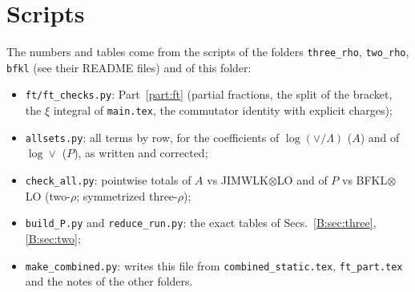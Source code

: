 \documentclass[10pt]{article}
\numberwithin{equation}{section}
\begin{document}
\section{Scripts}\label{app:scripts}
The numbers and tables come from the scripts of the folders \texttt{three\_rho}, \texttt{two\_rho}, \texttt{bfkl} (see their README files) and of this folder:
\begin{itemize}
\item \texttt{ft/ft\_checks.py}: Part~\ref{part:ft} (partial fractions, the split of the bracket, the $\xi$ integral of \texttt{main.tex}, the commutator identity with explicit charges);
\item \texttt{allsets.py}: all terms by row, for the coefficients of $\log(\vee/\Lambda)$ ($A$) and of $\log\vee$ ($P$), as written and corrected;
\item \texttt{check\_all.py}: pointwise totals of $A$ vs JIMWLK$\otimes$LO and of $P$ vs BFKL$\otimes$LO (two-$\rho$; symmetrized three-$\rho$);
\item \texttt{build\_P.py} and \texttt{reduce\_run.py}: the exact tables of Secs.~\ref{B:sec:three}, \ref{B:sec:two};
\item \texttt{make\_combined.py}: writes this file from \texttt{combined\_static.tex}, \texttt{ft\_part.tex} and the notes of the other folders.
\end{itemize}
\end{document}
